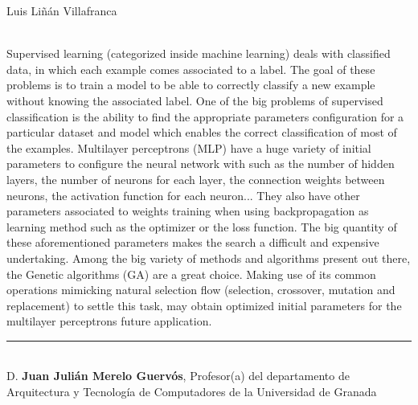 \begin{center}

    Luis Liñán Villafranca\\

\end{center}

\vspace{0.5cm}
\vspace{0.7cm}

\\

Supervised learning (categorized inside machine learning) deals with classified
data, in which each example comes associated to a label. The goal of these
problems is to train a model to be able to correctly classify a new example
without knowing the associated label. One of the big problems of supervised
classification is the ability to find the appropriate parameters configuration
for a particular dataset and model which enables the correct classification of
most of the examples. Multilayer perceptrons (MLP) have a huge variety of
initial parameters to configure the neural network with such as the number of
hidden layers, the number of neurons for each layer, the connection weights
between neurons, the activation function for each neuron... They also have
other parameters associated to weights training when using backpropagation as
learning method such as the optimizer or the loss function. The big quantity of
these aforementioned parameters makes the search a difficult and expensive
undertaking. Among the big variety of methods and algorithms present out there,
the Genetic algorithms (GA) are a great choice. Making use of its common
operations mimicking natural selection flow (selection, crossover, mutation and
replacement) to settle this task, may obtain optimized initial parameters for
the multilayer perceptrons future application.


\cleardoublepage

\thispagestyle{empty}

\noindent\rule[-1ex]{\textwidth}{2pt}\\[4.5ex]

D. \textbf{Juan Julián Merelo Guervós}, Profesor(a) del departamento de
Arquitectura y Tecnología de Computadores de la Universidad de Granada

\vspace{0.5cm}

